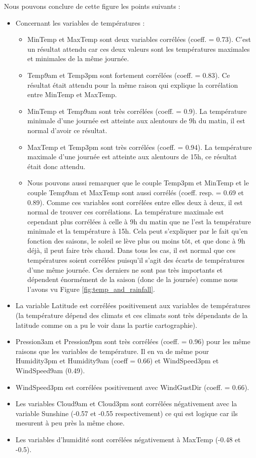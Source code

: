 \documentclass{article}
\begin{document}
Nous pouvons conclure de cette figure les points suivants : 
\begin{itemize}
    \item Concernant les variables de températures : 
    \begin{itemize}
        \item MinTemp et MaxTemp sont deux variables corrélées (coeff. = 0.73). C'est un résultat attendu car ces deux valeurs sont les températures maximales et minimales de la même journée. 
        \item Temp9am et Temp3pm sont fortement corrélées (coeff. = 0.83). Ce résultat était attendu pour la même raison qui explique la corrélation entre MinTemp et MaxTemp.
        \item MinTemp et Temp9am sont très corrélées (coeff. = 0.9). La température minimale d'une journée est atteinte aux alentours de 9h du matin, il est normal d'avoir ce résultat. 
        \item MaxTemp et Temp3pm sont très corrélées (coeff. = 0.94). La température maximale d'une journée est atteinte aux alentours de 15h, ce résultat était donc attendu. 
        \item Nous pouvons aussi remarquer que le couple Temp3pm et MinTemp et le couple Temp9am et MaxTemp sont aussi corrélés (coeff. resp. = 0.69 et 0.89). Comme ces variables sont corrélées entre elles deux à deux, il est normal de trouver ces corrélations. La température maximale est cependant plus corrélées à celle à 9h du matin que ne l'est la température minimale et la température à 15h. Cela peut s'expliquer par le fait qu'en fonction des saisons, le soleil se lève plus ou moins tôt, et que donc à 9h déjà, il peut faire très chaud. Dans tous les cas, il est normal que ces températures soient corrélées puisqu'il s'agit des écarts de températures d'une même journée. Ces derniers ne sont pas très importants et dépendent énormément de la saison (donc de la journée) comme nous l'avons vu Figure \ref{fig:temp_and_rainfall}. 
    \end{itemize}
    \item La variable Latitude est corrélées positivement aux variables de températures (la température dépend des climats et ces climats sont très dépendants de la latitude comme on a pu le voir dans la partie cartographie).
    \item Pression3am et Pression9pm sont très corrélées (coeff. = 0.96) pour les même raisons que les variables de température. Il en va de même pour Humidity3pm et Humidity9am (coeff = 0.66) et WindSpeed3pm et WindSpeed9am (0.49).
    \item WindSpeed3pm est corrélées positivement avec WindGustDir (coeff. = 0.66).
    \item Les variables Cloud9am et Cloud3pm sont corrélées négativement avec la variable Sunshine (-0.57 et -0.55 respectivement) ce qui est logique car ils mesurent à peu près la même chose. 
    \item Les variables d'humidité sont corrélées négativement à MaxTemp (-0.48 et -0.5).
\end{itemize}
\end{document}
